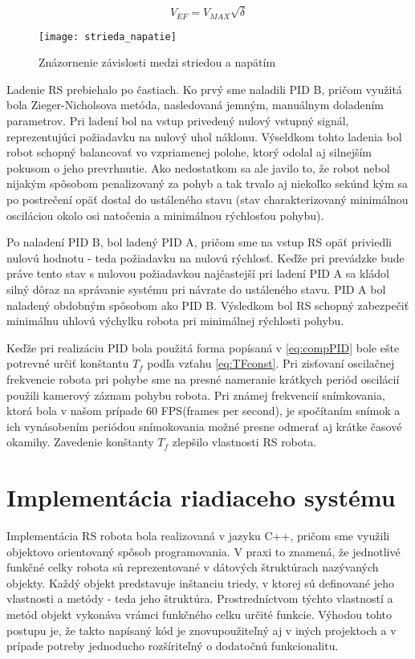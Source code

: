 \begin{equation}
V_{EF} = V_{MAX}\sqrt{\delta}
\label{eq:RMSSquare}
\end{equation}

\begin{figure}[b]
\centering
\texttt{[image: strieda\_napatie]}
\caption{Znázornenie závislosti medzi striedou a napätím}
\label{fig:strieda_napatie}
\end{figure}

Ladenie \ac{RS} prebiehalo po častiach. Ko prvý sme naladili PID B, pričom využitá bola Zieger-Nicholsova metóda, nasledovaná jemným, manuálnym doladením parametrov. Pri ladení bol na vstup privedený nulový vstupný signál, reprezentujúci požiadavku na nulový uhol náklonu. Výseldkom tohto ladenia bol robot schopný balancovať vo vzpriamenej polohe, ktorý odolal aj silnejším pokusom o jeho prevrhnutie. Ako nedostatkom sa ale javilo to, že robot nebol nijakým spôsobom penalizovaný za pohyb a tak trvalo aj niekoľko sekúnd kým sa po postrečení opäť dostal do ustáleného stavu (stav charakterizovaný minimálnou osciláciou okolo osi natočenia a minimálnou rýchlosťou pohybu).

Po naladení PID B, bol ladený PID A, pričom sme na vstup RS opäť priviedli nulovú hodnotu - teda požiadavku na nulovú rýchlosť. Keďže pri prevádzke bude práve tento stav s nulovou požiadavkou najčastejší pri ladení PID A sa kládol silný dôraz na správanie systému pri návrate do ustáleného stavu. PID A bol naladený obdobným spôsobom ako PID B. Výsledkom bol \ac{RS} schopný zabezpečiť minimálnu uhlovú výchylku robota pri minimálnej rýchlosti pohybu.

Keďže pri realizáciu PID bola použitá forma popísaná v \ref{eq:compPID} bole ešte potrevné určiť konštantu $T_f$ podľa vzťahu \ref{eq:TFconst}. Pri zisťovaní oscilačnej frekvencie robota pri pohybe sme na presné nameranie krátkych periód oscilácií použili kamerový záznam pohybu robota. Pri známej frekvencií snímkovania, ktorá bola v našom prípade 60 \ac{FPS}(frames per second), je spočítaním snímok a ich vynásobením periódou snímokovania možné presne odmerať aj krátke časové okamihy. Zavedenie konštanty $T_f$ zlepšilo vlastnosti \ac{RS} robota.

\section{Implementácia riadiaceho systému}
Implementácia \ac{RS} robota bola realizovaná v jazyku C++, pričom sme využili objektovo orientovaný spôsob programovania. V praxi to znamená, že jednotlivé funkčné celky robota sú reprezentované v dátových štruktúrach nazývaných objekty. Každý objekt predstavuje inštanciu triedy, v ktorej sú definované jeho vlastnosti a metódy - teda jeho štruktúra. Prostredníctvom týchto vlastností a metód objekt vykonáva vrámci funkčného celku určité funkcie. Výhodou tohto postupu je, že takto napísaný kód je znovupoužiteľný aj v iných projektoch a v prípade potreby jednoducho rozšíriteľný o dodatočnú funkcionalitu.

